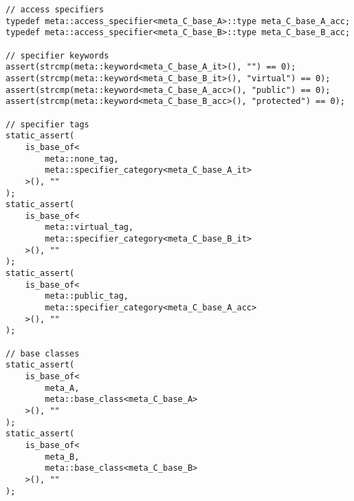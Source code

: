\begin{verbatim}
// access specifiers
typedef meta::access_specifier<meta_C_base_A>::type meta_C_base_A_acc;
typedef meta::access_specifier<meta_C_base_B>::type meta_C_base_B_acc;

// specifier keywords
assert(strcmp(meta::keyword<meta_C_base_A_it>(), "") == 0);
assert(strcmp(meta::keyword<meta_C_base_B_it>(), "virtual") == 0);
assert(strcmp(meta::keyword<meta_C_base_A_acc>(), "public") == 0);
assert(strcmp(meta::keyword<meta_C_base_B_acc>(), "protected") == 0);

// specifier tags
static_assert(
	is_base_of<
		meta::none_tag,
		meta::specifier_category<meta_C_base_A_it>
	>(), ""
);
static_assert(
	is_base_of<
		meta::virtual_tag,
		meta::specifier_category<meta_C_base_B_it>
	>(), ""
);
static_assert(
	is_base_of<
		meta::public_tag,
		meta::specifier_category<meta_C_base_A_acc>
	>(), ""
);

// base classes
static_assert(
	is_base_of<
		meta_A,
		meta::base_class<meta_C_base_A>
	>(), ""
);
static_assert(
	is_base_of<
		meta_B,
		meta::base_class<meta_C_base_B>
	>(), ""
);

\end{verbatim}

